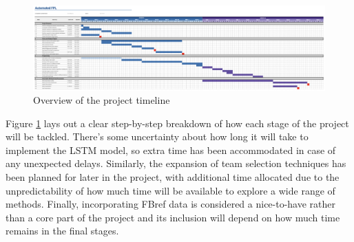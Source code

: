 \begin{figure}[H]
    \centering
    \includegraphics[width=15cm]{images/gant_chart.png}
    \caption{Overview of the project timeline}
    \label{fig:gantt_chart}
\end{figure}

Figure \ref{fig:gantt_chart} lays out a clear step-by-step breakdown of how each stage of the project will be tackled. There’s some uncertainty about how long it will take to implement the LSTM model, so extra time has been accommodated in case of any unexpected delays. Similarly, the expansion of team selection techniques has been planned for later in the project, with additional time allocated due to the unpredictability of how much time will be available to explore a wide range of methods. Finally, incorporating FBref data is considered a nice-to-have rather than a core part of the project and its inclusion will depend on how much time remains in the final stages.

